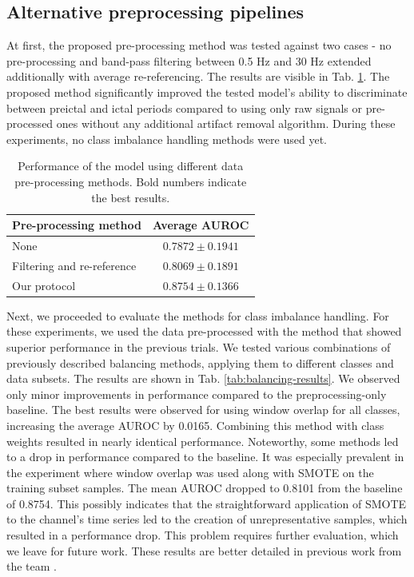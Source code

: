 \documentclass[a4paper,fleqn]{cas-sc}
\begin{document}
\subsection{Alternative preprocessing pipelines}
At first, the proposed pre-processing method was tested against two cases - no pre-processing and band-pass filtering between 0.5 Hz and 30 Hz extended additionally with average re-referencing. The results are visible in Tab. \ref{tab:pre-processing}. The proposed method significantly improved the tested model's ability to discriminate between preictal and ictal periods compared to using only raw signals or pre-processed ones without any additional artifact removal algorithm. During these experiments, no class imbalance handling methods were used yet.
\begin{table}[H]
\centering
\begin{tabular}{l||c}

\textbf{Pre-processing method} &  \textbf{Average AUROC} \\
\hline
None & $0.7872 \pm 0.1941$ \\
Filtering and re-reference & $0.8069 \pm 0.1891$ \\
Our protocol & $\mathbf{0.8754 \pm 0.1366}$ \\
\end{tabular}
\caption{Performance of the model using different data pre-processing methods. Bold numbers indicate the best results.}\label{tab:pre-processing}
\end{table}

Next, we proceeded to evaluate the methods for class imbalance handling. For these experiments, we used the data pre-processed with the method that showed superior performance in the previous trials. We tested various combinations of previously described balancing methods, applying them to different classes and data subsets. The results are shown in Tab. \ref{tab:balancing-results}. We observed only minor improvements in performance compared to the preprocessing-only baseline. The best results were observed for using window overlap for all classes, increasing the average AUROC by 0.0165. Combining this method with class weights resulted in nearly identical performance. Noteworthy, some methods led to a drop in performance compared to the baseline. It was especially prevalent in the experiment where window overlap was used along with SMOTE on the training subset samples. The mean AUROC dropped to 0.8101 from the baseline of 0.8754. This possibly indicates that the straightforward application of SMOTE to the channel's time series led to the creation of unrepresentative samples, which resulted in a performance drop. This problem requires further evaluation, which we leave for future work. These results are better detailed in previous work from the team \cite{MazurekPreprocessing}.
\end{document}
